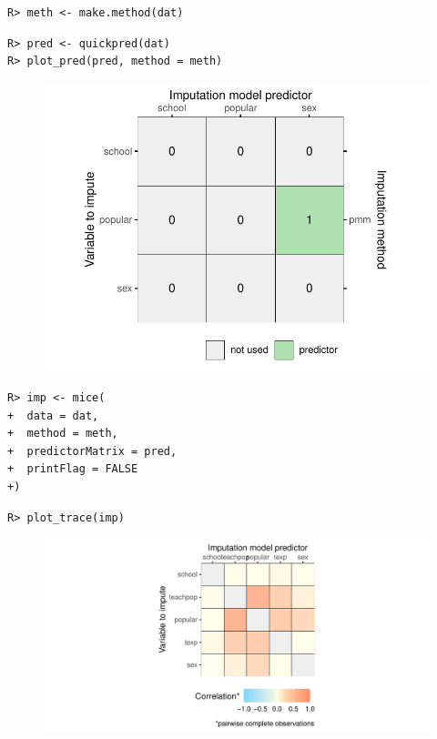 \documentclass[
  article]{jss}
\begin{document}
\begin{verbatim}
R> meth <- make.method(dat)
\end{verbatim}

\begin{verbatim}
R> pred <- quickpred(dat)
R> plot_pred(pred, method = meth)
\end{verbatim}

\begin{figure}[H]

{\centering \includegraphics{manuscript_files/figure-pdf/unnamed-chunk-7-1.pdf}

}

\end{figure}

\begin{verbatim}
R> imp <- mice(
+  data = dat,
+  method = meth,
+  predictorMatrix = pred,
+  printFlag = FALSE
+)
\end{verbatim}

\begin{verbatim}
R> plot_trace(imp)
\end{verbatim}

\begin{figure}[H]

{\centering \includegraphics{manuscript_files/figure-pdf/unnamed-chunk-9-1.pdf}

}

\end{figure}
\end{document}
